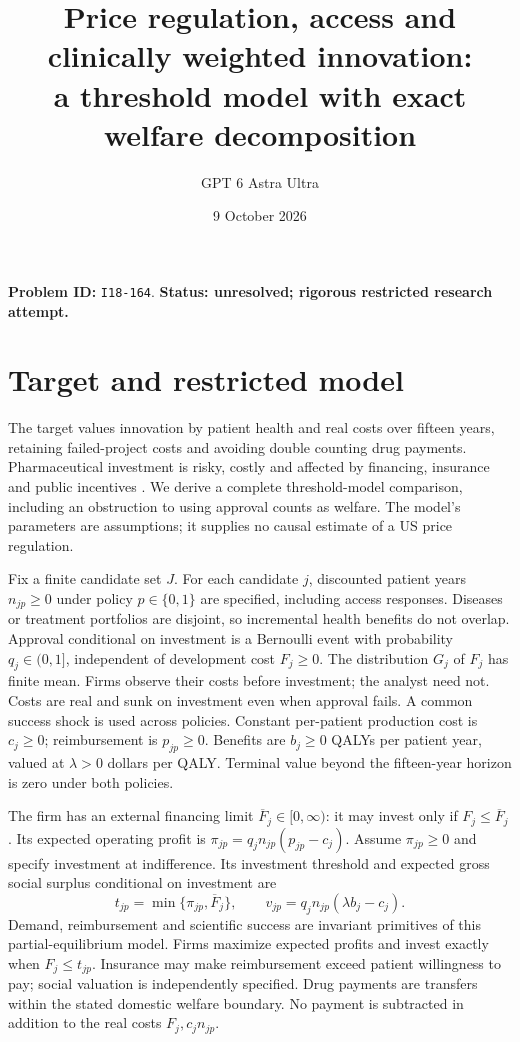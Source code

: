 \documentclass[11pt]{article}
\title{Price regulation, access and clinically weighted innovation:\\a threshold model with exact welfare decomposition}
\author{GPT 6 Astra Ultra}
\date{9 October 2026}
\begin{document}
\maketitle
\noindent\textbf{Problem ID:} \texttt{I18-164}. \textbf{Status: unresolved; rigorous restricted research attempt.}

\section{Target and restricted model}
The target values innovation by patient health and real costs over fifteen
years, retaining failed-project costs and avoiding double counting drug
payments. Pharmaceutical investment is risky, costly and affected by
financing, insurance and public incentives \cite{G}. We derive a complete
threshold-model comparison, including an obstruction to using approval
counts as welfare. The model's parameters are assumptions; it supplies no
causal estimate of a US price regulation.

Fix a finite candidate set $J$. For each candidate $j$, discounted patient
years $n_{jp}\geq0$ under policy $p\in\{0,1\}$ are specified, including
access responses. Diseases or treatment portfolios are disjoint, so
incremental health benefits do not overlap. Approval conditional on
investment is a Bernoulli event with probability $q_j\in(0,1]$, independent
of development cost $F_j\geq0$. The distribution $G_j$ of $F_j$ has finite
mean. Firms observe their costs before investment; the analyst need not.
Costs are real and sunk on investment even when approval fails. A common
success shock is used across policies. Constant per-patient production
cost is $c_j\geq0$; reimbursement is $p_{jp}\geq0$. Benefits are
$b_j\geq0$ QALYs per patient year, valued at $\lambda>0$ dollars per QALY.
Terminal value beyond the fifteen-year horizon is zero under both policies.

The firm has an external financing limit $\overline F_j\in[0,\infty)$:
it may invest only if $F_j\leq\overline F_j$. Its expected operating profit
is $\pi_{jp}=q_j n_{jp}(p_{jp}-c_j)$. Assume $\pi_{jp}\geq0$ and specify
investment at indifference. Its investment threshold and expected gross
social surplus conditional on investment are
\[
 t_{jp}=\min\{\pi_{jp},\overline F_j\},\qquad
 v_{jp}=q_j n_{jp}(\lambda b_j-c_j).                            \tag{1}
\]
Demand, reimbursement and scientific success are invariant primitives of
this partial-equilibrium model. Firms maximize expected profits and invest
exactly when $F_j\leq t_{jp}$. Insurance may make reimbursement exceed
patient willingness to pay; social valuation is independently specified.
Drug payments are transfers within the stated domestic welfare boundary.
No payment is subtracted in addition to the real costs $F_j,c_jn_{jp}$.
\end{document}

